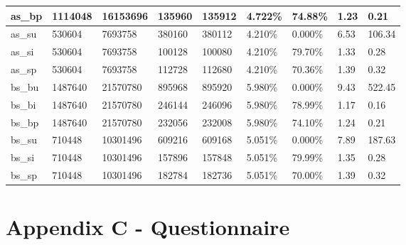 \documentclass[]{article}
\begin{document}
\begin{table}[htb]
\begin{tabular}{|l|l|l|l|l|l|l|l|l|}
as\_bp & 1114048             & 16153696    & 135960         & 135912        & 4.722\%          & 74.88\%         & 1.23        & 0.21      \\ \hline
as\_su & 530604              & 7693758     & 380160         & 380112        & 4.210\%          & 0.000\%         & 6.53        & 106.34    \\ \hline
as\_si & 530604              & 7693758     & 100128         & 100080        & 4.210\%          & 79.70\%         & 1.33        & 0.28      \\ \hline
as\_sp & 530604              & 7693758     & 112728         & 112680        & 4.210\%          & 70.36\%         & 1.39        & 0.32      \\ \hline
bs\_bu & 1487640             & 21570780    & 895968         & 895920        & 5.980\%          & 0.000\%         & 9.43        & 522.45    \\ \hline
bs\_bi & 1487640             & 21570780    & 246144         & 246096        & 5.980\%          & 78.99\%         & 1.17        & 0.16      \\ \hline
bs\_bp & 1487640             & 21570780    & 232056         & 232008        & 5.980\%          & 74.10\%         & 1.24        & 0.21      \\ \hline
bs\_su & 710448              & 10301496    & 609216         & 609168        & 5.051\%          & 0.000\%         & 7.89        & 187.63    \\ \hline
bs\_si & 710448              & 10301496    & 157896         & 157848        & 5.051\%          & 79.99\%         & 1.35        & 0.28      \\ \hline
bs\_sp & 710448              & 10301496    & 182784         & 182736        & 5.051\%          & 70.00\%         & 1.39        & 0.32      \\ \hline
\end{tabular}
\end{table}

\FloatBarrier

\pagebreak

\section{Appendix C - Questionnaire}\label{appendix-c}
\end{document}
